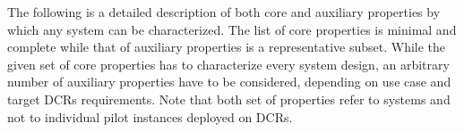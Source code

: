 \documentclass{sig-alternate}
\begin{document}
The following is a detailed description of both core and auxiliary properties by
which any \pilot system can be characterized. The list of core properties is
minimal and complete while that of auxiliary properties is a representative
subset. While the given set of core properties has to characterize every \pilot
system design, an arbitrary number of auxiliary properties have to be
considered, depending on use case and target DCRs requirements. Note that both
set of properties refer to \pilot systems and not to individual pilot instances
deployed on DCRs.






\end{document}
